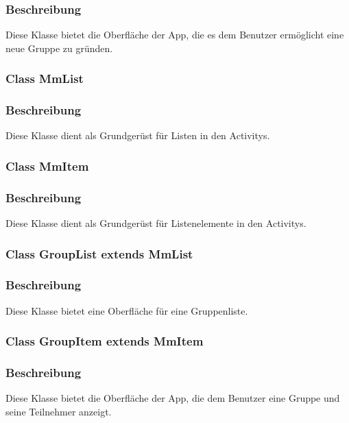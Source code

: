 \documentclass[a4paper]{scrreprt}
\begin{document}
\subsubsection*{Beschreibung}
Diese Klasse bietet die Oberfläche der App, die es dem Benutzer ermöglicht eine neue Gruppe zu gründen.


\subsubsection{Class MmList}
\subsubsection*{Beschreibung}
Diese Klasse dient als Grundgerüst für Listen in den Activitys. 


\subsubsection{Class MmItem}
\subsubsection*{Beschreibung}
Diese Klasse dient als Grundgerüst für Listenelemente in den Activitys. 


\subsubsection{Class GroupList extends MmList}
\subsubsection*{Beschreibung}
Diese Klasse bietet eine Oberfläche für eine Gruppenliste.


\subsubsection{Class GroupItem extends MmItem}
\subsubsection*{Beschreibung}
Diese Klasse bietet die Oberfläche der App, die dem Benutzer eine Gruppe und seine Teilnehmer anzeigt.
\end{document}
